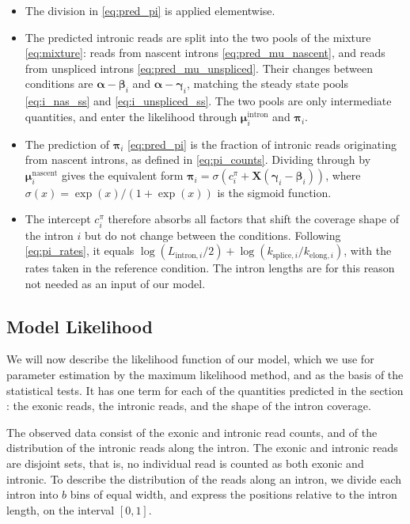 \documentclass[11pt]{article}
\begin{document}
	\begin{itemize}
		\item The division in \eqref{eq:pred_pi} is applied elementwise.
		\item The predicted intronic reads are split into the two pools of the mixture \eqref{eq:mixture}: reads from nascent introns \eqref{eq:pred_mu_nascent}, and reads from unspliced introns \eqref{eq:pred_mu_unspliced}. Their changes between conditions are $\boldsymbol{\alpha} - \boldsymbol{\beta}_i$ and $\boldsymbol{\alpha} - \boldsymbol{\gamma}_i$, matching the steady state pools \eqref{eq:i_nas_ss} and \eqref{eq:i_unspliced_ss}. The two pools are only intermediate quantities, and enter the likelihood through $\boldsymbol{\mu}^{\mathrm{intron}}_{i}$ and $\boldsymbol{\pi}_{i}$.
		\item The prediction of $\boldsymbol{\pi}_i$ \eqref{eq:pred_pi} is the fraction of intronic reads originating from nascent introns, as defined in \eqref{eq:pi_counts}. Dividing through by $\boldsymbol{\mu}^{\mathrm{nascent}}_{i}$ gives the equivalent form $\boldsymbol{\pi}_i = \sigma \left( c^{\pi}_{i} + \boldsymbol{X} (\boldsymbol{\gamma}_i - \boldsymbol{\beta}_i) \right)$, where $\sigma(x) = \exp(x) / (1 + \exp(x))$ is the sigmoid function.
		\item The intercept $c^{\pi}_{i}$ therefore absorbs all factors that shift the coverage shape of the intron $i$ but do not change between the conditions. Following \eqref{eq:pi_rates}, it equals $\log ( L_{\mathrm{intron},i} / 2 ) + \log ( k_{\mathrm{splice},i} / k_{\mathrm{elong},i} )$, with the rates taken in the reference condition. The intron lengths are for this reason not needed as an input of our model.
	\end{itemize}

	\subsection{Model Likelihood} \label{subsec:likelihood}	
	

	We will now describe the likelihood function of our model, which we use for parameter estimation by the maximum likelihood method, and as the basis of the statistical tests. It has one term for each of the quantities predicted in the section : the exonic reads, the intronic reads, and the shape of the intron coverage.

	The observed data consist of the exonic and intronic read counts, and of the distribution of the intronic reads along the intron. The exonic and intronic reads are disjoint sets, that is, no individual read is counted as both exonic and intronic. To describe the distribution of the reads along an intron, we divide each intron into $b$ bins of equal width, and express the positions relative to the intron length, on the interval $[0,1]$.
\end{document}
